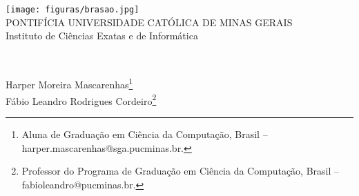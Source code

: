 \documentclass[a4paper,12pt,Times]{article}
\makeatletter
\newcommand{\monog}{}
\newcommand{\monogES}{}
\newcommand{\origem}{Brasil }
\newcommand{\AutorA}{Harper Moreira Mascarenhas}
\newcommand{\funcaoA}{}
\newcommand{\emailA}{harper.mascarenhas@sga.pucminas.br}
\newcommand{\cursA}{Aluna de Graduação em Ciência da Computação}
\newcommand{\AutorB}{Fábio Leandro Rodrigues Cordeiro}
\newcommand{\funcaoB}{}
\newcommand{\emailB}{fabioleandro@pucminas.br}
\newcommand{\cursB}{Professor do Programa de Graduação em Ciência da Computação}
\newcommand{\keyword}[1]{\textsf{#1}}
\makeatother
\begin{document}

\begin{center}
\texttt{[image: figuras/brasao.jpg]} \\
PONTIFÍCIA UNIVERSIDADE CATÓLICA DE MINAS GERAIS \\
Instituto de Ciências Exatas e de Informática


\end{center}

 \vspace{0cm} {
 \singlespacing \Large{\monog {} \\ }
  \normalsize{\monogES}
 }

\vspace{1.0cm}

\begin{flushright}
\singlespacing 
\normalsize{\AutorA \footnote{\funcaoA \cursA, \origem -- \emailA . }} \\
\normalsize{\AutorB \footnote{\funcaoB \cursB, \origem -- \emailB . }} \\
\end{flushright}
\thispagestyle{empty}

\vspace{1.0cm}

\begin{abstract}
\noindent
O resumo deverá conter pelo menos cento e cinquenta palavras de acordo com o padrão de normalização da ABNT.
Este artigo irá abordar as principais linguagens de programação voltadas a ambiente WEB usadas atualmente, 
comparando suas características de maneira a indicar o melhor uso para determinada linguagem. 
As linguagens serão divididas de acordo com 4 principais características: Interpretadas, compiladas, server-side e client-side.
O resumo deverá conter pelo menos cento e cinquenta palavras de acordo com o padrão de normalização da ABNT.
as linguagens serão divididas de acordo com 4 principais características: Interpretadas, compiladas, server-side e client-side.
O resumo deverá conter pelo menos cento e cinquenta palavras de acordo com o padrão de normalização da ABNT.
\\\textbf{\keyword{Palavras-chave: }} Template. \LaTeX. Abakos. Periódicos.
\end{abstract}
\end{document}
